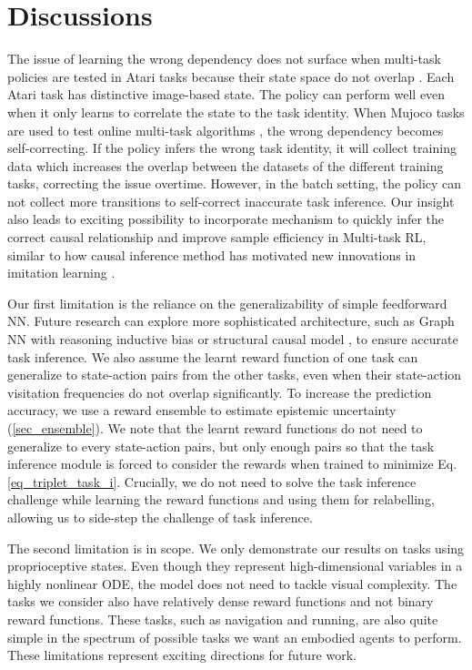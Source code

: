 \section{Discussions}

The issue of learning the wrong dependency does not surface when multi-task policies are tested in Atari tasks because their state space do not overlap \cite{ActorMimicParisotto2015,hessel2019multi,impala2018}.
Each Atari task has distinctive image-based state. The policy can perform well even when it only learns to correlate the state to the task identity. When Mujoco tasks are used to test online multi-task algorithms \cite{zintgraf2020varibad, fakoor2019meta}, the wrong dependency becomes self-correcting. If the policy infers the wrong task identity, it will collect training data which increases the overlap between the datasets of the different training tasks, correcting the issue overtime. However, in the batch setting, the policy can not collect more transitions to self-correct inaccurate task inference. Our insight also leads to exciting possibility to incorporate mechanism to quickly infer the correct causal relationship and improve sample efficiency in Multi-task RL, similar to how causal inference method has motivated new innovations in imitation learning \cite{de2019causal}. 

Our first limitation is the reliance on the generalizability of simple feedforward NN. Future research can explore more sophisticated architecture, such as Graph NN with reasoning inductive bias \cite{xu2019can,scarselli2008graph,wu2020comprehensive,zhou2018graph} or structural causal model \cite{pearl2010introduction, pearl2009causal}, to ensure accurate task inference. We also assume the learnt reward function of one task can generalize to state-action pairs from the other tasks, even when their state-action visitation frequencies do not overlap significantly. To increase the prediction accuracy, we use a reward ensemble to estimate epistemic uncertainty (\autoref{sec_ensemble}). We note that the learnt reward functions do not need to generalize to every state-action pairs, but only enough pairs so that the task inference module is forced to consider the rewards when trained to minimize Eq. \ref{eq_triplet_task_i}. Crucially, we do not need to solve the task inference challenge while learning the reward functions and using them for relabelling, allowing us to side-step the challenge of task inference.

The second limitation is in scope. We only demonstrate our results on tasks using proprioceptive states. Even though they represent high-dimensional variables in a highly nonlinear ODE, the model does not need to tackle visual complexity. The tasks we consider also have relatively dense reward functions and not binary reward functions. These tasks, such as navigation and running, are also quite simple in the spectrum of possible tasks we want an embodied agents to perform. These limitations represent exciting directions for future work.

